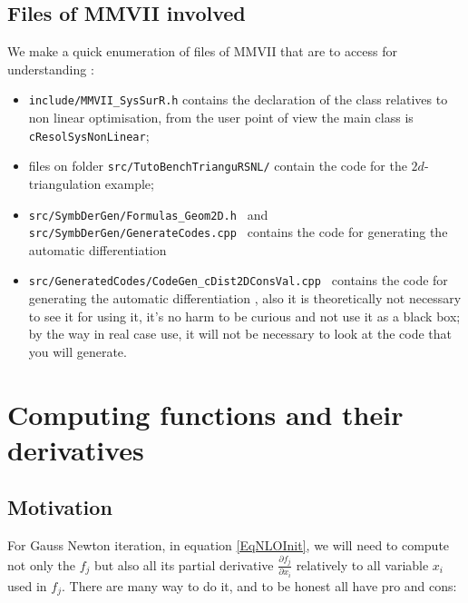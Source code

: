 \subsection{Files of MMVII involved}

We make a quick enumeration of files of MMVII that are to access for understanding :

\begin{itemize}
    \item {\tt include/MMVII\_SysSurR.h} contains the declaration of the class relatives to
          non linear optimisation, from the user point of view the main class
          is {\tt  cResolSysNonLinear};

    \item files on folder {\tt src/TutoBenchTrianguRSNL/} contain the code for the $2d$-triangulation
          example;

    \item {\tt src/SymbDerGen/Formulas\_Geom2D.h } and {\tt src/SymbDerGen/GenerateCodes.cpp } 
          contains the code for generating the automatic differentiation 

    \item {\tt src/GeneratedCodes/CodeGen\_cDist2DConsVal.cpp } contains the code for 
          generating the automatic differentiation , also it is theoretically not necessary 
          to see it for using it, it's no harm to be curious and not use it as a black box;
          by the way in real case use, it will not be necessary to look at the code that you
          will generate.
\end{itemize}


\section{Computing functions and their derivatives}
\label{Compute:Deriv:SysNL}

\subsection{Motivation}

For Gauss Newton iteration, in equation \ref{EqNLOInit}, we will need to compute not only
the $f_j$ but also all its partial derivative $\frac{\partial f_j}{\partial x_i}$
relatively to all variable $x_i$ used in $f_j$.  There are many way to do it,
and to be honest  all have  pro and cons:

